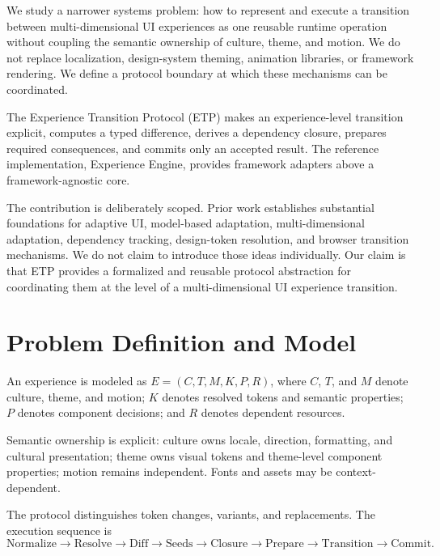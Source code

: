 \documentclass[manuscript,anonymous]{acmart}
\begin{document}
We study a narrower systems problem: how to represent and execute a transition between
multi-dimensional UI experiences as one reusable runtime operation without coupling the
semantic ownership of culture, theme, and motion. We do not replace localization,
design-system theming, animation libraries, or framework rendering. We define a protocol
boundary at which these mechanisms can be coordinated.

The Experience Transition Protocol (ETP) makes an experience-level transition explicit,
computes a typed difference, derives a dependency closure, prepares required consequences,
and commits only an accepted result. The reference implementation, Experience Engine,
provides framework adapters above a framework-agnostic core.

The contribution is deliberately scoped. Prior work establishes substantial foundations for
adaptive UI, model-based adaptation, multi-dimensional adaptation, dependency tracking,
design-token resolution, and browser transition mechanisms. We do not claim to introduce
those ideas individually. Our claim is that ETP provides a formalized and reusable protocol
abstraction for coordinating them at the level of a multi-dimensional UI experience
transition.

\section{Problem Definition and Model}
An experience is modeled as $E=(C,T,M,K,P,R)$, where $C$, $T$, and $M$ denote culture,
theme, and motion; $K$ denotes resolved tokens and semantic properties; $P$ denotes
component decisions; and $R$ denotes dependent resources.

Semantic ownership is explicit: culture owns locale, direction, formatting, and cultural
presentation; theme owns visual tokens and theme-level component properties; motion remains
independent. Fonts and assets may be context-dependent.

The protocol distinguishes token changes, variants, and replacements. The execution sequence is
\[
\mathrm{Normalize}\rightarrow\mathrm{Resolve}\rightarrow\mathrm{Diff}\rightarrow
\mathrm{Seeds}\rightarrow\mathrm{Closure}\rightarrow\mathrm{Prepare}\rightarrow
\mathrm{Transition}\rightarrow\mathrm{Commit}.
\]
\end{document}
